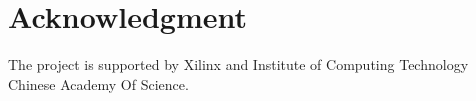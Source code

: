 \documentclass[conference]{IEEEtran}
\begin{document}

\section*{Acknowledgment}

The project is supported by Xilinx and Institute of Computing Technology Chinese Academy Of Science.
\end{document}
